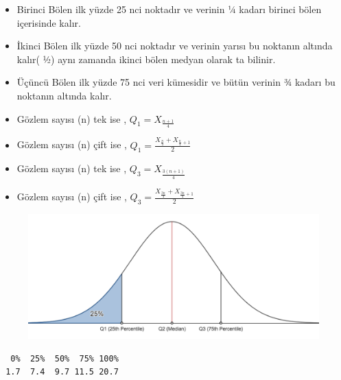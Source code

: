 \documentclass[
  letterpaper,
  DIV=11,
  numbers=noendperiod]{scrreprt}
\newenvironment{Shaded}{\begin{snugshade}}{\end{snugshade}}
\newcommand{\AttributeTok}[1]{\textcolor[rgb]{0.40,0.45,0.13}{#1}}
\newcommand{\ConstantTok}[1]{\textcolor[rgb]{0.56,0.35,0.01}{#1}}
\newcommand{\FunctionTok}[1]{\textcolor[rgb]{0.28,0.35,0.67}{#1}}
\newcommand{\NormalTok}[1]{\textcolor[rgb]{0.00,0.23,0.31}{#1}}
\newcommand{\SpecialCharTok}[1]{\textcolor[rgb]{0.37,0.37,0.37}{#1}}
\begin{document}
\begin{itemize}
\item
  Birinci Bölen ilk yüzde 25 nci noktadır ve verinin ¼ kadarı birinci
  bölen içerisinde kalır.
\item
  İkinci Bölen ilk yüzde 50 nci noktadır ve verinin yarısı bu noktanın
  altında kalır( ½) aynı zamanda ikinci bölen medyan olarak ta bilinir.
\item
  Üçüncü Bölen ilk yüzde 75 nci veri kümesidir ve bütün verinin ¾ kadarı
  bu noktanın altında kalır.
\item
  Gözlem sayısı (n) tek ise , \(Q_1 = X_{\frac{n+1}{4}}\)
\item
  Gözlem sayısı (n) çift ise ,
  \(Q_1 = \frac{X_\frac{n}{4}+X_{\frac{n}{4}+1}}{2}\)
\item
  Gözlem sayısı (n) tek ise , \(Q_3 = X_{\frac{3(n+1)}{4}}\)
\item
  Gözlem sayısı (n) çift ise ,
  \(Q_3 = \frac{X_\frac{3n}{4}+X_{\frac{3n}{4}+1}}{2}\)
\end{itemize}

\begin{figure}

{\centering \includegraphics{images/quartile.png}

}

\end{figure}

\begin{Shaded}
\end{Shaded}

\begin{verbatim}
  0%  25%  50%  75% 100% 
 1.7  7.4  9.7 11.5 20.7 
\end{verbatim}
\end{document}
